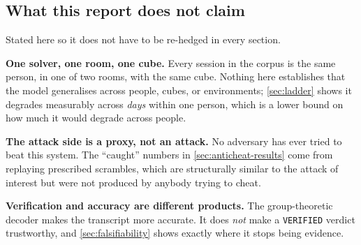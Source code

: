 \subsection{What this report does not claim}

Stated here so it does not have to be re-hedged in every section.

\begin{keybox}
\textbf{One solver, one room, one cube.} Every session in the corpus is the
same person, in one of two rooms, with the same cube. Nothing here
establishes that the model generalises across people, cubes, or
environments; \cref{sec:ladder} shows it degrades measurably across
\emph{days} within one person, which is a lower bound on how much it would
degrade across people.

\smallskip
\textbf{The attack side is a proxy, not an attack.} No adversary has ever
tried to beat this system. The ``caught'' numbers in
\cref{sec:anticheat-results} come from replaying prescribed scrambles, which
are structurally similar to the attack of interest but were not produced by
anybody trying to cheat.

\smallskip
\textbf{Verification and accuracy are different products.} The
group-theoretic decoder makes the transcript more accurate. It does
\emph{not} make a \texttt{VERIFIED} verdict trustworthy, and
\cref{sec:falsifiability} shows exactly where it stops being evidence.
\end{keybox}
